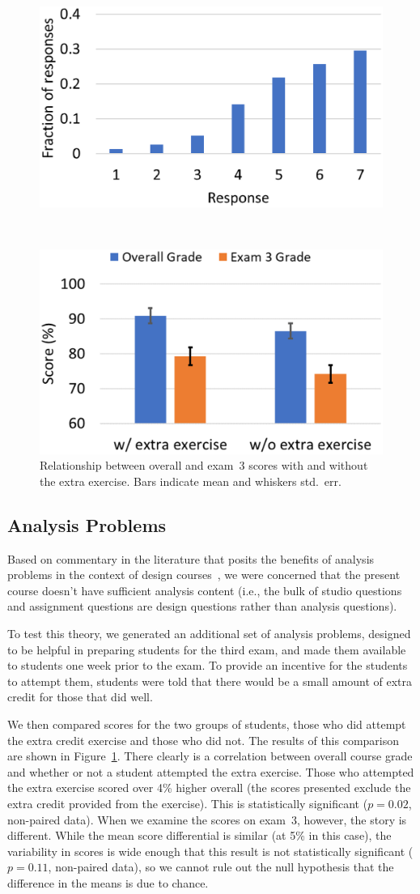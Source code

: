 \begin{figure}[t]
\centering
\parbox{0.48\columnwidth}{%
   \includegraphics[width=0.47\columnwidth]{pace}
   \caption{Student ratings of statement, ``The material was covered
at a reasonable pace''  (scoring: 1 - Strongly Disagree, 7 - Strongly Agree).}
   \label{fig:pace}
}
~
\parbox{0.48\columnwidth}{%
   \includegraphics[width=0.47\columnwidth]{scores}
   \caption{Relationship between overall and exam~3 scores
with and without the extra exercise. Bars indicate mean and
whiskers std.~err.}
   \label{fig:scores}
}
\end{figure}

\subsection{Analysis Problems}

Based on commentary in the literature that posits the benefits of
analysis problems in the context of design courses~\cite{wjbo01},
we were concerned that the present
course doesn't have sufficient analysis content (i.e., the bulk of
studio questions and assignment questions are design questions rather
than analysis questions).

To test this theory, we generated an additional set of analysis problems,
designed to be helpful in preparing students for the third exam, and
made them available to students one week prior to the exam.  To provide
an incentive for the students to attempt them, students were told that
there would be a small amount of extra credit for those that did well.

We then compared scores for the two groups of students, those who did
attempt the extra credit exercise and those who did not.  The results
of this comparison are shown in Figure~\ref{fig:scores}.
There clearly is a correlation between overall course grade and
whether or not a student attempted the extra exercise.
Those who attempted the extra exercise scored over 4\% higher overall
(the scores presented exclude the extra credit provided from the
exercise).  This is statistically significant ($p = 0.02$, non-paired data).
When we examine the scores on exam~3, however, the story is different.
While the mean score differential is similar (at 5\% in this case), the
variability in scores is wide enough that this result is not
statistically significant ($p = 0.11$, non-paired data), so we cannot
rule out the null hypothesis that the difference in the means is
due to chance.

